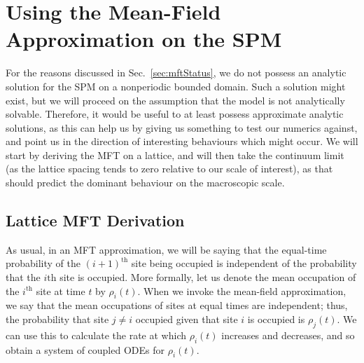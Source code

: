 \section{Using the Mean-Field Approximation on the SPM} \label{sec:spmMft}
For the reasons discussed in Sec.~\ref{sec:mftStatus}, we do not possess an analytic solution for the SPM on a nonperiodic bounded domain. Such a solution might exist, but
we will proceed on the assumption that the model is not analytically solvable. Therefore, it would be useful to at least possess approximate analytic solutions, as this can help us by giving us
something to test our numerics against, and point us in the direction of interesting behaviours which might occur. We will start by deriving the MFT on a lattice, and will then take the continuum limit (as the lattice spacing tends to zero
relative to our scale of interest), as that should predict the dominant behaviour on the macroscopic scale.


\subsection{Lattice MFT Derivation} 
\label{sec:latticeMFT}
As usual, in an MFT approximation, we will be saying that the equal-time probability of the $(i+1)^\mathrm{th}$ site being occupied is independent of the probability that the $i\mathrm{th}$ site is occupied.
More formally, let us denote the mean occupation of the $i^\mathrm{th}$ site at time $t$ by $\rho_i (t)$. When we invoke the mean-field approximation, we say that the mean occupations of sites at equal times are independent; thus,
the probability that site $j \ne i$ occupied given that site $i$ is occupied is $\rho_j (t)$. We can use this to calculate the rate at which $\rho_i (t)$ increases and decreases, and so obtain a system of coupled ODEs for $\rho_i (t)$.

